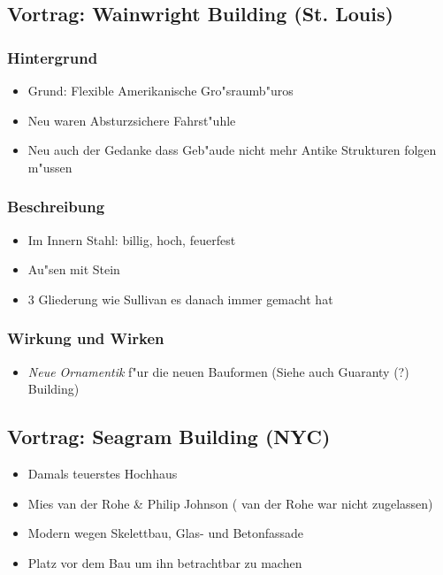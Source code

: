 \documentclass[a5paper]{scrartcl}
\begin{document}
\subsection{Vortrag: Wainwright Building (St. Louis)}

\subsubsection{Hintergrund}

\begin{itemize}
  \item Grund: Flexible Amerikanische Gro"sraumb"uros
  \item Neu waren Absturzsichere Fahrst"uhle
  \item Neu auch der Gedanke dass Geb"aude nicht mehr Antike Strukturen folgen m"ussen
\end{itemize}


\subsubsection{Beschreibung}

\begin{itemize}
  \item Im Innern Stahl: billig, hoch, feuerfest
  \item Au"sen mit Stein 
  \item 3 Gliederung wie Sullivan es danach immer gemacht hat
\end{itemize}


\subsubsection{Wirkung und Wirken}

\begin{itemize}
  \item \emph{Neue Ornamentik} f"ur die neuen Bauformen (Siehe auch Guaranty (?) Building)
\end{itemize}

\subsection{Vortrag: Seagram Building (NYC)}


\begin{itemize}
  \item Damals teuerstes Hochhaus
  \item Mies van der Rohe \& Philip Johnson ( van der Rohe war nicht zugelassen)
  \item Modern wegen Skelettbau, Glas- und Betonfassade
  \item Platz vor dem Bau um ihn betrachtbar zu machen
\end{itemize}
\end{document}
